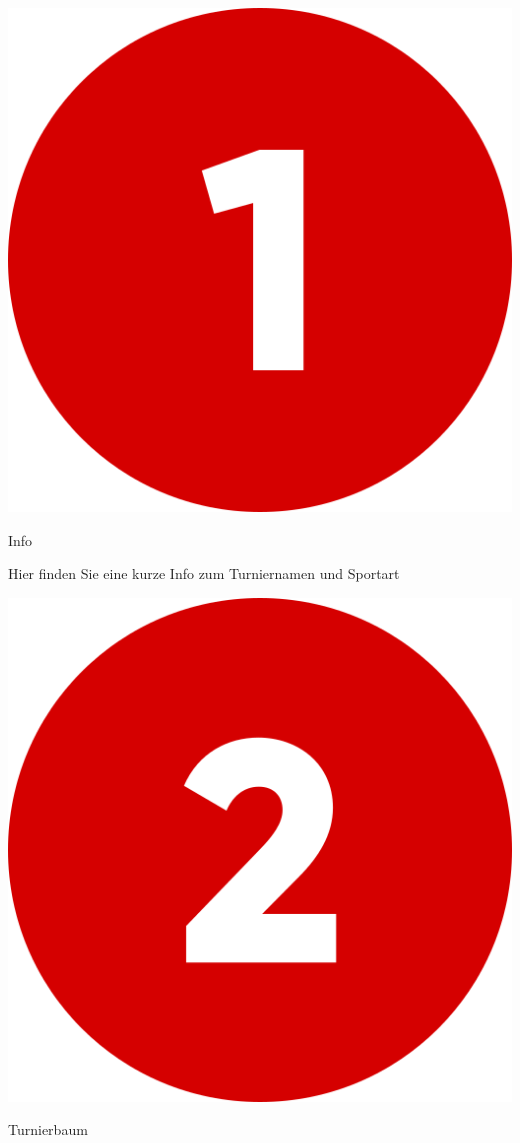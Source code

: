 \includegraphics[scale=0.05]{pics/user-guide/numbers/number-1.png} \begin{LARGE} Info \end{LARGE}

Hier finden Sie eine kurze Info zum Turniernamen und Sportart
\bigskip

\includegraphics[scale=0.05]{pics/user-guide/numbers/number-2.png} \begin{LARGE} Turnierbaum \end{LARGE}

